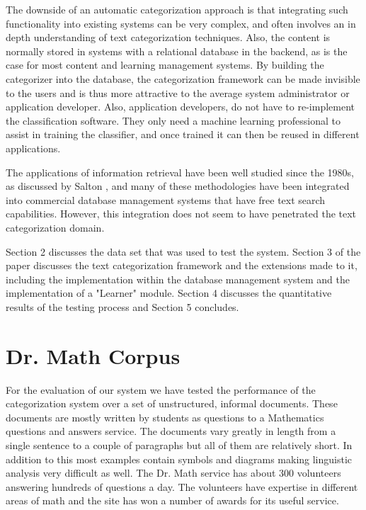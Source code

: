 \documentclass[twocolumn]{article}
\begin{document}
The downside of an automatic categorization approach is that integrating such 
functionality into existing systems can be very complex, and often involves an in 
depth understanding of text categorization techniques.  Also, the content is normally 
stored in systems with a relational database in the backend, as is the case for most 
content and learning management systems. By building the categorizer into the 
database, the categorization framework\cite{williams:02} can be made invisible to the 
users and is thus more attractive to the average system administrator or application 
developer. Also, application developers, do not have to re-implement the 
classification software. They only need a machine learning professional to assist in 
training the classifier, and once trained it can then be reused in different applications. 

The applications of information retrieval have been well studied since the 1980s, as 
discussed by Salton \cite{salton:89,salton:91}, and many of these methodologies have been 
integrated into commercial database management systems that have free text search 
capabilities. However, this integration does not seem to have penetrated the text 
categorization domain.

Section 2 discusses the data set that was used to test the system. Section 3 of the 
paper discusses the text categorization framework and the extensions made to it, 
including the implementation within the database management system and the 
implementation of a "Learner" module. Section 4 discusses the quantitative results of 
the testing process and Section 5 concludes.

\section{Dr. Math Corpus}

For the evaluation of our system we have tested the performance of the categorization 
system over a set of unstructured, informal documents. These documents are mostly 
written by students as questions to a Mathematics questions and answers service. 
The documents vary greatly in length from a single sentence to a couple of paragraphs 
but all of them are relatively short. In addition to this most examples contain symbols 
and diagrams making linguistic analysis very difficult as well. The Dr. Math service 
has about 300 volunteers answering hundreds of questions a day. The volunteers have 
expertise in different areas of math and the site has won a number of awards for its 
useful service. 
\end{document}
